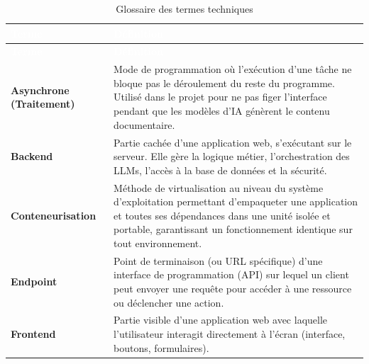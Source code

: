 \documentclass[12pt, a4paper]{report}
\begin{document}
\begin{longtable}{|p{4.5cm}|p{\dimexpr\textwidth-5.1cm}|}
    \hline
    \rowcolor{ChapColor}
    \textcolor{white}{\textbf{Terme}} & \textcolor{white}{\textbf{Définition}} \\ \hline
    \endfirsthead

    \hline
    \rowcolor{ChapColor}
    \textcolor{white}{\textbf{Terme}} & \textcolor{white}{\textbf{Définition}} \\ \hline
    \endhead

    \hline
    \endfoot

    \hline
    \caption{Glossaire des termes techniques}
    \label{tab:glossaire}
    \endlastfoot

    
    \hypertarget{glo:1}{}\textbf{Asynchrone (Traitement)} & Mode de programmation où l'exécution d'une tâche ne bloque pas le déroulement du reste du programme. Utilisé dans le projet pour ne pas figer l'interface pendant que les modèles d'IA génèrent le contenu documentaire. \\ \hline
    
    \hypertarget{glo:2}{}\textbf{Backend} & Partie cachée d'une application web, s'exécutant sur le serveur. Elle gère la logique métier, l'orchestration des LLMs, l'accès à la base de données et la sécurité. \\ \hline
    
    \hypertarget{glo:3}{}\textbf{Conteneurisation} & Méthode de virtualisation au niveau du système d'exploitation permettant d'empaqueter une application et toutes ses dépendances dans une unité isolée et portable, garantissant un fonctionnement identique sur tout environnement. \\ \hline
    
    \hypertarget{glo:4}{}\textbf{Endpoint} & Point de terminaison (ou URL spécifique) d'une interface de programmation (API) sur lequel un client peut envoyer une requête pour accéder à une ressource ou déclencher une action. \\ \hline
    
    \hypertarget{glo:5}{}\textbf{Frontend} & Partie visible d'une application web avec laquelle l'utilisateur interagit directement à l'écran (interface, boutons, formulaires). \\ \hline
    

\end{longtable}
\end{document}
